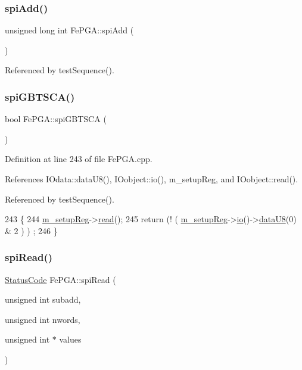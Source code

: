 \subsubsection{\texorpdfstring{spi\+Add()}{spiAdd()}}
{\footnotesize\ttfamily unsigned long int Fe\+P\+G\+A\+::spi\+Add (\begin{DoxyParamCaption}{ }\end{DoxyParamCaption})}



Referenced by test\+Sequence().

\mbox{\label{classFePGA_ad305543bda4d68fe181cd7fa614b2fe1}} 
\subsubsection{\texorpdfstring{spi\+G\+B\+T\+S\+C\+A()}{spiGBTSCA()}}
{\footnotesize\ttfamily bool Fe\+P\+G\+A\+::spi\+G\+B\+T\+S\+CA (\begin{DoxyParamCaption}{ }\end{DoxyParamCaption})}



Definition at line 243 of file Fe\+P\+G\+A.\+cpp.



References I\+Odata\+::data\+U8(), I\+Oobject\+::io(), m\+\_\+setup\+Reg, and I\+Oobject\+::read().



Referenced by test\+Sequence().


\begin{DoxyCode}
243                       \{
244   \hyperlink{classFePGA_a0255fe229013986b4387c3a75ddf4e97}{m\_setupReg}->\hyperlink{classIOobject_aa07610c11963b1db6710e3c76ceea456}{read}();
245   \textcolor{keywordflow}{return} (! ( \hyperlink{classFePGA_a0255fe229013986b4387c3a75ddf4e97}{m\_setupReg}->\hyperlink{classIOobject_af04fb94137c3d86849f478ac5afab5d1}{io}()->\hyperlink{classIOdata_a75e9c318dbac3a39402179070943d4bc}{dataU8}(0) & 2 ) ) ;
246 \}
\end{DoxyCode}
\mbox{\label{classFePGA_a637b93fed75b576a54e723acb36cb6a3}} 
\subsubsection{\texorpdfstring{spi\+Read()}{spiRead()}\hspace{0.1cm}{\footnotesize\ttfamily [1/3]}}
{\footnotesize\ttfamily \hyperlink{classStatusCode}{Status\+Code} Fe\+P\+G\+A\+::spi\+Read (\begin{DoxyParamCaption}\item[{unsigned int}]{subadd,  }\item[{unsigned int}]{nwords,  }\item[{unsigned int $\ast$}]{values }\end{DoxyParamCaption})}



